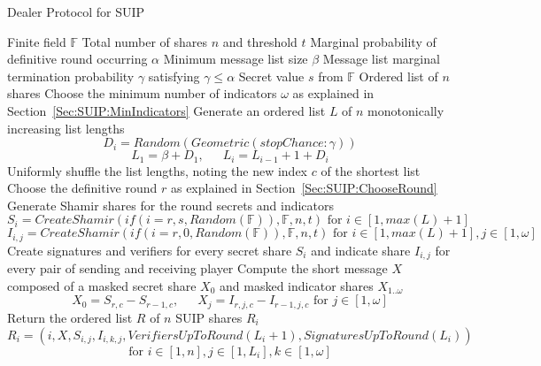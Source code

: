 \documentclass{dalcsthesis}
\begin{document}
\begin{algorithm}
  \caption{Dealer Protocol for SUIP}
  \label{alg:SUIP:Dealer}
  \begin{algorithmic}
    \INPUT Finite field $\mathbb{F}$
    \INPUT Total number of shares $n$ and threshold $t$
    \INPUT Marginal probability of definitive round occurring $\alpha$
    \INPUT Minimum message list size $\beta$
    \INPUT Message list marginal termination probability $\gamma$ satisfying $\gamma \leq \alpha$
    \INPUT Secret value $s$ from $\mathbb{F}$
    \OUTPUT Ordered list of $n$ shares
    \STATE Choose the minimum number of indicators $\omega$ as explained in Section~\ref{Sec:SUIP:MinIndicators}
    \STATE Generate an ordered list $L$ of $n$ monotonically increasing list lengths
    	$$D_i = Random(Geometric(stopChance: \gamma))$$
    	$$L_1 = \beta + D_1 \text{, } \text{ } \text{ } L_i = L_{i-1} + 1 + D_i$$
    \STATE Uniformly shuffle the list lengths, noting the new index $c$ of the shortest list
    \STATE Choose the definitive round $r$ as explained in Section~\ref{Sec:SUIP:ChooseRound}
    \STATE Generate Shamir shares for the round secrets and indicators
    	$$S_{i} = CreateShamir(if(i = r, s, Random(\mathbb{F})), \mathbb{F}, n, t) \text{ for } i \in [1, max(L)+1]$$
    	$$I_{i,j} = CreateShamir(if(i = r, 0, Random(\mathbb{F})), \mathbb{F}, n, t) \text{ for } i \in [1, max(L)+1], j \in [1, \omega]$$
    \STATE Create signatures and verifiers for every secret share $S_i$ and indicate share $I_{i,j}$ for every pair of sending and receiving player
    \STATE Compute the short message $X$ composed of a masked secret share $X_0$ and masked indicator shares $X_{1..\omega}$
    	$$X_0 = S_{r,c} - S_{r-1,c} \text{, } \text{ } \text{ } X_j = I_{r,j,c} - I_{r-1,j,c} \text{ for } j \in [1, \omega]$$
    \STATE Return the ordered list $R$ of $n$ SUIP shares $R_i$
    	$$R_i = (i, X, S_{i,j}, I_{i,k,j}, VerifiersUpToRound(L_i+1), SignaturesUpToRound(L_i))$$
    	$$\text{for } i \in [1, n], j \in [1, L_i], k \in [1, \omega]$$
  \end{algorithmic}
\end{algorithm}
\end{document}
